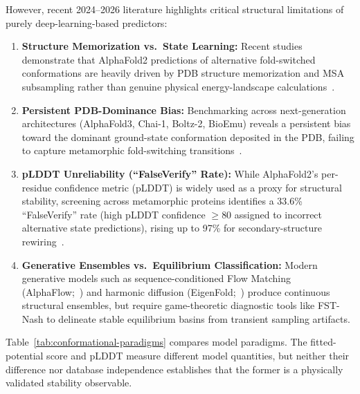 \documentclass[12pt,a4paper]{article}
\theoremstyle{remark}
\begin{document}
However, recent 2024--2026 literature highlights critical structural limitations of purely deep-learning-based predictors:
\begin{enumerate}
    \item \textbf{Structure Memorization vs.\ State Learning:} Recent studies demonstrate that AlphaFold2 predictions of alternative fold-switched conformations are heavily driven by PDB structure memorization and MSA subsampling rather than genuine physical energy-landscape calculations~\citep{NatureComms2024}.
    \item \textbf{Persistent PDB-Dominance Bias:} Benchmarking across next-generation architectures (AlphaFold3, Chai-1, Boltz-2, BioEmu) reveals a persistent bias toward the dominant ground-state conformation deposited in the PDB, failing to capture metamorphic fold-switching transitions~\citep{Ye2026}.
    \item \textbf{pLDDT Unreliability (``FalseVerify'' Rate):} While AlphaFold2's per-residue confidence metric (pLDDT) is widely used as a proxy for structural stability, screening across metamorphic proteins identifies a 33.6\% ``FalseVerify'' rate (high pLDDT confidence $\ge 80$ assigned to incorrect alternative state predictions), rising up to 97\% for secondary-structure rewiring~\citep{Thacker2026}.
    \item \textbf{Generative Ensembles vs.\ Equilibrium Classification:} Modern generative models such as sequence-conditioned Flow Matching (AlphaFlow;~\citealp{JingFlow2024}) and harmonic diffusion (EigenFold;~\citealp{JingDiffusion2023}) produce continuous structural ensembles, but require game-theoretic diagnostic tools like FST-Nash to delineate stable equilibrium basins from transient sampling artifacts.
\end{enumerate}

Table~\ref{tab:conformational-paradigms} compares model paradigms. The fitted-potential score and pLDDT measure different model quantities, but neither their difference nor database independence establishes that the former is a physically validated stability observable.
\end{document}
